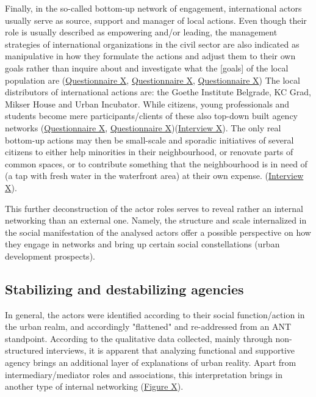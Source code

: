 \documentclass[11pt]{report}
\begin{document}
{{{{Finally, in the so-called bottom-up network of engagement, international actors usually serve as source, support and manager of local actions.
Even though their role is usually described as empowering and/or leading, the management strategies of international organizations in the civil sector are also indicated as manipulative in how they formulate the actions and adjust them to their own goals rather than inquire about and investigate what the [goals] of the local  population are (\href{Questionnaire Experts Savamala}{Questionnaire X}, \href{Questionnaire PhD Savamala}{Questionnaire X}, \href{Questionnaire Student Savamala}{Questionnaire X})
The local distributors of international actions are: the Goethe Institute Belgrade, KC Grad, Mikser House and Urban Incubator.
While citizens, young professionals and students become mere participants/clients of these also top-down built agency networks (\href{Questionnaire Experts Savamala}{Questionnaire X}, \href{Questionnaire Students Savamala}{Questionnaire X})(\href{InterviewX}{Interview X}).
The only real bottom-up actions may then be small-scale and sporadic initiatives of several citizens to either help minorities in their neighbourhood, or renovate parts of common spaces, or to contribute  something that the neighbourhood is in need of (a tap with fresh water in the waterfront area) at their own expense. (\href{InterviewX}{Interview X}).

This further deconstruction of the actor roles serves to reveal rather an internal networking than an external one. Namely, the structure and scale internalized in the social manifestation of the analysed actors offer a possible perspective on how they engage in networks and bring up certain social constellations (urban development prospects).

\subsection{Stabilizing and destabilizing agencies}

In general, the actors were identified according to their social function/action in the urban realm, and accordingly "flattened" and re-addressed from an ANT standpoint. According to the qualitative data collected, mainly through non-structured interviews, it is apparent that analyzing functional and supportive agency brings an additional layer of explanations of urban reality. Apart from intermediary/mediator roles and associations, this interpretation brings in another type of internal networking (\href{Figure 7}{Figure X}).
\\

}}}}
\end{document}
